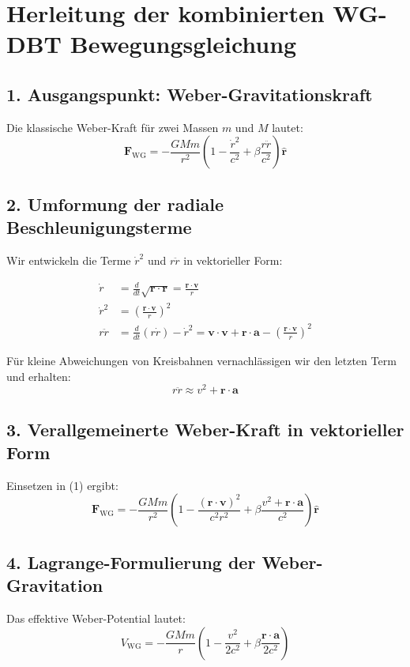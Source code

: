 \section{Herleitung der kombinierten WG-DBT Bewegungsgleichung}

\subsection*{1. Ausgangspunkt: Weber-Gravitationskraft}
Die klassische Weber-Kraft für zwei Massen $m$ und $M$ lautet:
\begin{equation}
\mathbf{F}_{\text{WG}} = -\frac{GMm}{r^2}\left(1 - \frac{\dot{r}^2}{c^2} + \beta\frac{r\ddot{r}}{c^2}\right)\hat{\mathbf{r}}
\end{equation}

\subsection*{2. Umformung der radiale Beschleunigungsterme}
Wir entwickeln die Terme $\dot{r}^2$ und $r\ddot{r}$ in vektorieller Form:

\begin{align}
\dot{r} &= \frac{d}{dt}\sqrt{\mathbf{r}\cdot\mathbf{r}} = \frac{\mathbf{r}\cdot\mathbf{v}}{r} \\
\dot{r}^2 &= \left(\frac{\mathbf{r}\cdot\mathbf{v}}{r}\right)^2 \\
r\ddot{r} &= \frac{d}{dt}(r\dot{r}) - \dot{r}^2 = \mathbf{v}\cdot\mathbf{v} + \mathbf{r}\cdot\mathbf{a} - \left(\frac{\mathbf{r}\cdot\mathbf{v}}{r}\right)^2
\end{align}

Für kleine Abweichungen von Kreisbahnen vernachlässigen wir den letzten Term und erhalten:
\begin{equation}
r\ddot{r} \approx v^2 + \mathbf{r}\cdot\mathbf{a}
\end{equation}

\subsection*{3. Verallgemeinerte Weber-Kraft in vektorieller Form}
Einsetzen in (1) ergibt:
\begin{equation}
\mathbf{F}_{\text{WG}} = -\frac{GMm}{r^2}\left(1 - \frac{(\mathbf{r}\cdot\mathbf{v})^2}{c^2r^2} + \beta\frac{v^2 + \mathbf{r}\cdot\mathbf{a}}{c^2}\right)\hat{\mathbf{r}}
\end{equation}

\subsection*{4. Lagrange-Formulierung der Weber-Gravitation}
Das effektive Weber-Potential lautet:
\begin{equation}
V_{\text{WG}} = -\frac{GMm}{r}\left(1 - \frac{v^2}{2c^2} + \beta\frac{\mathbf{r}\cdot\mathbf{a}}{2c^2}\right)
\end{equation}

